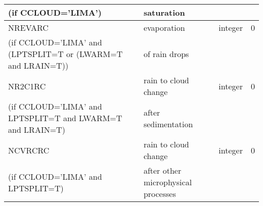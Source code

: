 \begin{longtable} {|p{}|p{}|>{\centering}p{}|p{}<{\centering}|}
(if CCLOUD='LIMA') &saturation &   &  \\\hline
NREVARC  & evaporation   & integer  &  0 \index{NREVARC!\innam{NAM\_BU\_RRC}}\\ \nopagebreak
(if CCLOUD='LIMA' and (LPTSPLIT=T or (LWARM=T and LRAIN=T)) & of rain drops &   &  \\\hline
NR2C1RC  & rain to cloud change & integer  &  0 \index{NR2C1RC!\innam{NAM\_BU\_RRC}}\\ \nopagebreak
(if CCLOUD='LIMA' and LPTSPLIT=T and LWARM=T and LRAIN=T) & after sedimentation &   &  \\\hline
NCVRCRC  & rain to cloud change & integer  &  0 \index{NCVRCRC!\innam{NAM\_BU\_RRC}}\\ \nopagebreak
(if CCLOUD='LIMA' and LPTSPLIT=T) &after other microphysical processes &   &  \\\hline
\end{longtable}

